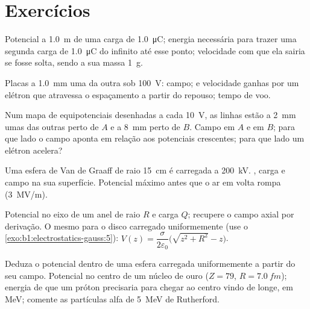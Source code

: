 \section{Exercícios}

\begin{exercise}[$\star$]\label{exo:b1:potential-capacitors:1}
Potencial a \qty{1.0}{m} de uma carga de \qty{1.0}{\micro C}; energia necessária
para trazer uma segunda carga de \qty{1.0}{\micro C} do infinito até esse ponto; velocidade
com que ela sairia se fosse solta, sendo a sua massa \qty{1}{g}.
\end{exercise}

\begin{exercise}[$\star$]\label{exo:b1:potential-capacitors:2}
Placas a \qty{1.0}{mm} uma da outra sob \qty{100}{V}: campo;  e
velocidade ganhas por um elétron que atravessa o espaçamento a partir do repouso; tempo de
voo.
\end{exercise}

\begin{exercise}[$\star$]\label{exo:b1:potential-capacitors:3}
Num mapa de equipotenciais desenhadas a cada \qty{10}{V}, as linhas estão a
\qty{2}{mm} umas das outras perto de $A$ e a \qty{8}{mm} perto de $B$. Campo em $A$
e em $B$; para que lado o campo aponta em relação aos potenciais crescentes;
para que lado um elétron acelera?
\end{exercise}

\begin{exercise}[$\star$]\label{exo:b1:potential-capacitors:4}
Uma esfera de Van de Graaff de raio \qty{15}{cm} é carregada a \qty{200}{kV}.
, carga e campo na sua superfície. Potencial máximo antes que
o ar em volta rompa (\qty{3}{MV/m}).
\end{exercise}

\begin{exercise}[$\star\star$]\label{exo:b1:potential-capacitors:5}
Potencial no eixo de um anel de raio $R$ e carga $Q$; recupere
o campo axial por derivação. O mesmo para o disco carregado uniformemente
(use o \cref{exo:b1:electrostatics-gauss:5}): $V(z) = \dfrac{\sigma}{2\varepsilon_0}
\bigl(\sqrt{z^2 + R^2} - z\bigr)$.
\end{exercise}

\begin{exercise}[$\star\star$]\label{exo:b1:potential-capacitors:6}
Deduza o potencial dentro de uma esfera carregada uniformemente a partir do seu campo.
Potencial no centro de um núcleo de ouro ($Z = 79$, $R = \qty{7.0}{fm}$);
energia de que um próton precisaria para chegar ao centro vindo de longe, em
\unit{MeV}; comente as partículas alfa de \qty{5}{MeV} de Rutherford.
\end{exercise}

